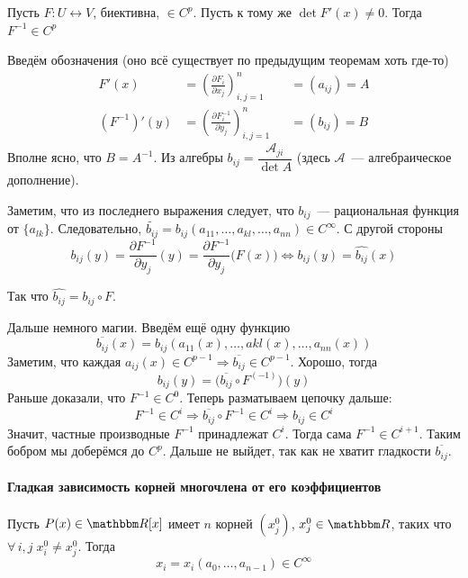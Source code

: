\documentclass[12pt,trimbord]{../../../notes}
\begin{document}
\begin{thrm}\label{thrm:diffspace::invsmooth}
  Пусть $F\colon U \leftrightarrow V$, биективна, $\in C^p$. Пусть к тому же $\det F'(x) \neq 0$.
  Тогда $F^{-1} \in C^p$
\end{thrm}
\begin{ittproof}
  Введём обозначения (оно всё существует по предыдущим теоремам хоть где-то)
  \[
    \begin{aligned}
      F'(x) &= \left(\frac{\partial F_i}{\partial x_j}\right)_{i,j=1}^n & &= (a_{ij}) = A \\
      (F^{-1})'(y) &= \left(\frac{\partial F^{-1}_i}{\partial y_j}\right)_{i,j=1}^n & &= (b_{ij}) = B 
    \end{aligned}
  \]
  Вполне ясно, что $B = A^{-1}$. Из алгебры $b_{ij} = \dfrac{\mathcal A_{ji}}{\det A}$ 
  (здесь $\mathcal A$~--- алгебраическое дополнение).
  
  Заметим, что из последнего выражения следует, что $b_{ij}$~--- рациональная функция от $\{a_{lk}\}$.
  Следовательно, $\widetilde{b_{ij}} = b_{ij}(a_{11}, \dotsc, a_{kl}, \dotsc, a_{nn}) \in C^\infty$.
  С другой стороны
  \[
    b_{ij}(y) = \frac{\partial F^{-1}}{\partial y_j}(y) = \frac{\partial F^{-1}}{\partial y_j}\bigl(F(x)\bigr)
    \Leftrightarrow b_{ij}(y) = \widehat{b_{ij}}(x)
  \]

  Так что $\widehat{b_{ij}} = b_{ij} \circ F$. 

  Дальше немного магии. Введём ещё одну функцию
  \[
    \overline{b_{ij}}(x) = b_{ij}(a_{11}(x), \dotsc, a{kl}(x), \dotsc, a_{nn}(x))   
  \]
  Заметим, что каждая $a_{ij}(x) \in C^{p-1} \Rightarrow \overline{b_{ij}} \in C^{p-1}$.
  Хорошо, тогда 
  \[
    b_{ij}(y) = \bigl(\overline{b_{ij}} \circ F^{(-1)}\bigr)(y) 
  \]
  Раньше доказали, что $F^{-1} \in C^0$. Теперь разматываем цепочку дальше:
  \[
    F^{-1} \in C^i \Rightarrow \overline{b_{ij}} \circ F^{-1} \in C^i \Rightarrow b_{ij} \in C^i 
  \]
  Значит, частные производные $F^{-1}$ принадлежат $C^i$. Тогда сама $F^{-1} \in C^{i+1}$.
  Таким бобром мы доберёмся до $C^p$. 
  Дальше не выйдет, так как не хватит гладкости $\overline{b_{ij}}$.
\end{ittproof}

\paragraph{Гладкая зависимость корней многочлена от его коэффициентов}
\label{par:diffspace::smoothpolyroots}

\begin{thrm}\label{thrm:diffspace::smoothpolyroots}
  Пусть $P(x) \in \R[x]$ имеет $n$ корней $(x^0_j)$,  $x^0_j \in \R$, таких что $\forall\, i,j \; x^0_i \neq x^0_j$.  
  Тогда 
  \[
    x_i = x_i(a_0, \dotsc, a_{n-1}) \in C^\infty
  \]
\end{thrm}
\end{document}
